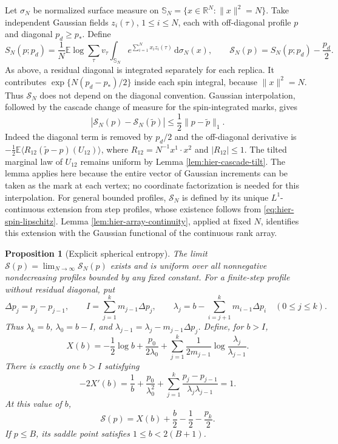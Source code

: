 \documentclass[11pt,a4paper]{article}
\numberwithin{equation}{section}
\newtheorem{proposition}[theorem]{Proposition}
\theoremstyle{definition}
\theoremstyle{remark}
\newcommand{\E}{\mathbb E}
\newcommand{\R}{\mathbb R}
\newcommand{\dd}{\mathrm d}
\begin{document}
Let $\sigma_N$ be normalized surface measure on
$\mathbb S_N=\{x\in\R^N:\|x\|^2=N\}$.  Take independent Gaussian fields
$z_i(\tau)$, $1\le i\le N$, each with off-diagonal profile $p$ and diagonal
$p_d\ge p_*$.  Define
\[
 S_N(p;p_d)=\frac1N\E\log\sum_\tau v_\tau
       \int_{\mathbb S_N}e^{\sum_{i=1}^N x_i z_i(\tau)}\,\dd\sigma_N(x),
 \qquad \mathcal S_N(p)=S_N(p;p_d)-\frac{p_d}{2}.
\]
As above, a residual diagonal is integrated separately for each replica.
It contributes $\exp\{N(p_d-p_*)/2\}$ inside each spin integral, because
$\|x\|^2=N$.  Thus $\mathcal S_N$ does not depend on the diagonal convention.
Gaussian interpolation, followed by the cascade change of measure for the
spin-integrated marks, gives
\begin{equation}
 |\mathcal S_N(p)-\mathcal S_N(\widetilde p)|
 \le\frac12\|p-\widetilde p\|_1.
 \label{eq:hier-spin-lipschitz}
\end{equation}
Indeed the diagonal term is removed by $p_d/2$ and the off-diagonal
derivative is
$-\frac12\E\langle R_{12}(\widetilde p-p)(U_{12})\rangle$,
where $R_{12}=N^{-1}x^1\cdot x^2$ and $|R_{12}|\le1$.  The tilted marginal
law of $U_{12}$ remains uniform by Lemma \ref{lem:hier-cascade-tilt}.
The lemma applies here because the entire vector of Gaussian increments
can be taken as the mark at each vertex; no coordinate factorization is
needed for this interpolation.
For general bounded profiles, $\mathcal S_N$ is defined by its unique
$L^1$-continuous extension from step profiles, whose existence follows from
\eqref{eq:hier-spin-lipschitz}.  Lemma \ref{lem:hier-array-continuity},
applied at fixed $N$, identifies this extension with the Gaussian functional
of the continuous rank array.

\begin{proposition}[Explicit spherical entropy]
\label{prop:hier-spherical-limit}
The limit $\mathcal S(p)=\lim_{N\to\infty}\mathcal S_N(p)$ exists and is
uniform over all nonnegative nondecreasing profiles bounded by any fixed
constant.  For a finite-step profile without residual diagonal, put
\[
 \Delta p_j=p_j-p_{j-1},\qquad
 I=\sum_{j=1}^k m_{j-1}\Delta p_j,
 \qquad
 \lambda_j=b-\sum_{i=j+1}^k m_{i-1}\Delta p_i\quad(0\le j\le k).
\]
Thus $\lambda_k=b$, $\lambda_0=b-I$, and
$\lambda_{j-1}=\lambda_j-m_{j-1}\Delta p_j$.  Define, for $b>I$,
\begin{equation}
 X(b)=-\frac12\log b+\frac{p_0}{2\lambda_0}
       +\sum_{j=1}^k\frac1{2m_{j-1}}
                         \log\frac{\lambda_j}{\lambda_{j-1}}.
 \label{eq:hier-gaussian-spin}
\end{equation}
There is exactly one $b>I$ satisfying
\begin{equation}
 -2X'(b)=\frac1b+\frac{p_0}{\lambda_0^2}
       +\sum_{j=1}^k\frac{p_j-p_{j-1}}{\lambda_j\lambda_{j-1}}=1.
 \label{eq:src2}
\end{equation}
At this value of $b$,
\begin{equation}
 \mathcal S(p)=X(b)+\frac b2-\frac12-\frac{p_k}{2}.
 \label{eq:hier-spherical-value}
\end{equation}
If $p\le B$, its saddle point satisfies
$1\le b<2(B+1)$.
\end{proposition}
\end{document}
